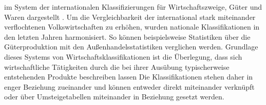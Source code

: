  im System der internationalen Klassifizierungen für Wirtschaftszweige, Güter und Waren dargestellt  \autocites[][]{bib.983}. Um die Vergleichbarkeit der international stark miteinander verflochtenen Volkswirtschaften zu erhöhen, wurden nationale Klassifikationen in den letzten Jahren harmonisiert. \glqq So können beispielsweise Statistiken über die Güterproduktion mit den Außenhandelsstatistiken verglichen werden. Grundlage dieses Systems von Wirtschaftsklassifikationen ist die Überlegung, dass sich wirtschaftliche Tätigkeiten durch die bei ihrer Ausübung typischerweise entstehenden Produkte beschreiben lassen\grqq   \autocites[][]{bib.983} Die Klassifikationen stehen daher in enger Beziehung zueinander und können entweder direkt miteinander verknüpft oder über Umsteigetabellen miteinander in Beziehung gesetzt werden.~\\

